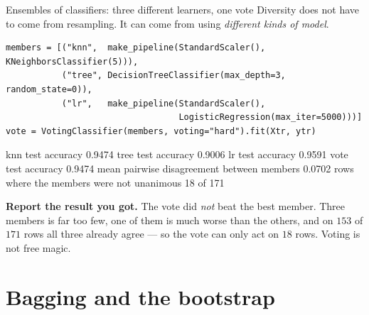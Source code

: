 \documentclass[aspectratio=169]{beamer}
\begin{document}
\begin{frame}[fragile,shrink=8]{Ensembles of classifiers: three different learners, one vote}
  Diversity does not have to come from resampling. It can come from using
  \emph{different kinds of model}.
\begin{lstlisting}
members = [("knn",  make_pipeline(StandardScaler(), KNeighborsClassifier(5))),
           ("tree", DecisionTreeClassifier(max_depth=3, random_state=0)),
           ("lr",   make_pipeline(StandardScaler(),
                                  LogisticRegression(max_iter=5000)))]
vote = VotingClassifier(members, voting="hard").fit(Xtr, ytr)
\end{lstlisting}
\begin{outblk}
knn   test accuracy 0.9474
tree  test accuracy 0.9006
lr    test accuracy 0.9591
vote  test accuracy 0.9474
mean pairwise disagreement between members 0.0702
rows where the members were not unanimous  18 of 171
\end{outblk}
  \begin{center}\small
    \textbf{Report the result you got.} The vote did \emph{not} beat the best
    member. Three members is far too few, one of them is much worse than the
    others, and on $153$ of $171$ rows all three already agree --- so the vote
    can only act on $18$ rows. Voting is not free magic.
  \end{center}
\end{frame}

\section[Bagging]{Bagging and the bootstrap}
\label{sec:bag}
\end{document}
